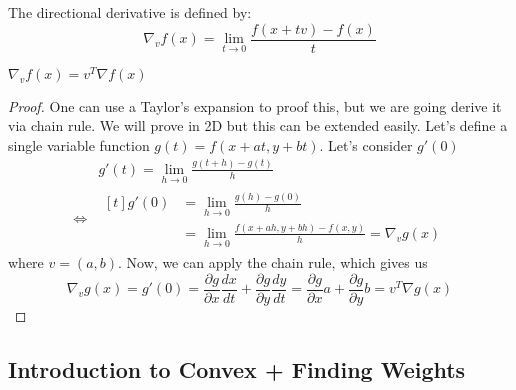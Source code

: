 \begin{definition}
    The directional derivative is defined by:
    \begin{equation*}
        \nabla_{v} f(x) = \lim_{t\rightarrow 0} \frac{f(x + tv) - f(x)}{t} 
    \end{equation*}
\end{definition}

\begin{lemma}
    $\nabla_{v} f(x) = v^T\nabla f(x)$
\end{lemma}
\begin{proof}
    One can use a Taylor's expansion to proof this, but we are going derive it via chain rule. We will prove in 2D but this can be extended easily. Let's define a single variable function $g(t) = f(x + at, y+ bt)$. Let's consider $g'(0)$
    \begin{equation*}
    \begin{aligned}
        &g'(t) = \lim_{h\rightarrow0} \frac{g(t + h) - g(t)}{h}   \\
        \iff& \begin{aligned}[t]
            g'(0) &= \lim_{h\rightarrow0} \frac{g(h) - g(0)}{h}   \\
            &=\lim_{h\rightarrow0} \frac{f(x+ah, y+bh) - f(x, y)}{h} = \nabla_{v}g(x)
        \end{aligned}
    \end{aligned}
    \end{equation*}
    where $v = (a, b)$. Now, we can apply the chain rule, which gives us 
    \begin{equation*}
        \nabla_{v}g(x) = g'(0) = \frac{\partial g}{\partial x}\frac{dx}{dt} + \frac{\partial g}{\partial y}\frac{dy}{dt} = \frac{\partial g}{\partial x}a+\frac{\partial g}{\partial y}b = v^T\nabla g(x)
    \end{equation*}
\end{proof}

\subsection{Introduction to Convex + Finding Weights}

